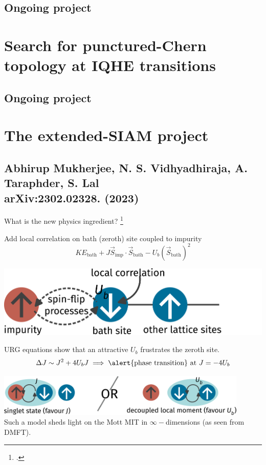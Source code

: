 \documentclass[aspectratio=169]{beamer}
\begin{document}
\subsection{Ongoing project}

\section{Search for punctured-Chern topology at IQHE transitions}
\subsection{Ongoing project}

\section{The extended-SIAM project}
\subsection{Abhirup Mukherjee, N. S. Vidhyadhiraja, A. Taraphder, S. Lal\\ arXiv:2302.02328. (2023)}

\begin{frame}{What is the new physics ingredient?}
\footcite{kotliar1992}
\begin{minipage}{0.39\textwidth}
	Add \alert{local correlation} on bath (zeroth) site coupled to impurity
\[KE_\text{bath} + J \vec{S}_\text{imp}\cdot\vec{S}_\text{bath} - U_b\left( \vec{S}_\text{bath} \right)^2 \]
\end{minipage}
\hspace*{\fill}
\begin{minipage}{0.55\textwidth}
\includegraphics[width=\textwidth]{zeromode_bare.pdf}
\end{minipage}

\vspace*{\fill}
URG equations show that an \alert{attractive} \(U_b\) frustrates the zeroth site.
\[\Delta J \sim J^2 + 4U_b J \implies \text{\alert{phase transition} at }J = -4U_b\]

\vspace*{\fill}
\includegraphics[width=0.9\textwidth]{frustration.pdf}\\

\vspace*{\fill}
Such a model sheds light on the Mott MIT in \(\infty-\)dimensions (as seen from DMFT).
\end{frame}
\end{document}
